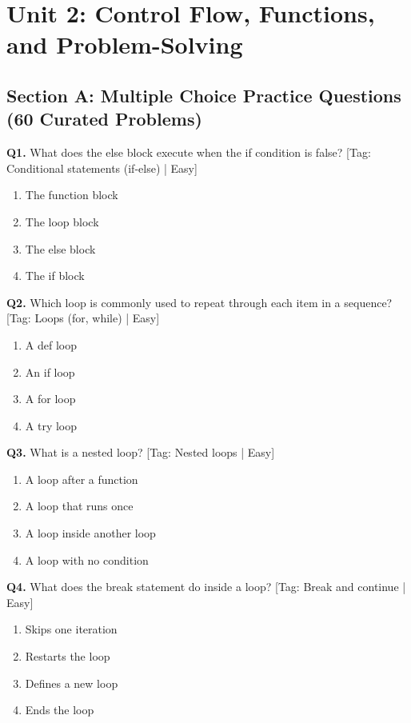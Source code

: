 \chapter{Unit 2: Control Flow, Functions, and Problem-Solving}

\section{Section A: Multiple Choice Practice Questions (60 Curated Problems)}

\noindent\textbf{Q1.} What does the else block execute when the if condition is false? \hfill [Tag: Conditional statements (if-else) | Easy]
\begin{enumerate}[label=(\alph*),topsep=2pt,itemsep=1pt,partopsep=0pt,parsep=0pt]
    \item {The function block}
    \item {The loop block}
    \item {The else block}
    \item {The if block}
\end{enumerate}
\vspace{2mm}
\noindent\textbf{Q2.} Which loop is commonly used to repeat through each item in a sequence? \hfill [Tag: Loops (for, while) | Easy]
\begin{enumerate}[label=(\alph*),topsep=2pt,itemsep=1pt,partopsep=0pt,parsep=0pt]
    \item {A def loop}
    \item {An if loop}
    \item {A for loop}
    \item {A try loop}
\end{enumerate}
\vspace{2mm}
\noindent\textbf{Q3.} What is a nested loop? \hfill [Tag: Nested loops | Easy]
\begin{enumerate}[label=(\alph*),topsep=2pt,itemsep=1pt,partopsep=0pt,parsep=0pt]
    \item {A loop after a function}
    \item {A loop that runs once}
    \item {A loop inside another loop}
    \item {A loop with no condition}
\end{enumerate}
\vspace{2mm}
\noindent\textbf{Q4.} What does the break statement do inside a loop? \hfill [Tag: Break and continue | Easy]
\begin{enumerate}[label=(\alph*),topsep=2pt,itemsep=1pt,partopsep=0pt,parsep=0pt]
    \item {Skips one iteration}
    \item {Restarts the loop}
    \item {Defines a new loop}
    \item {Ends the loop}
\end{enumerate}
